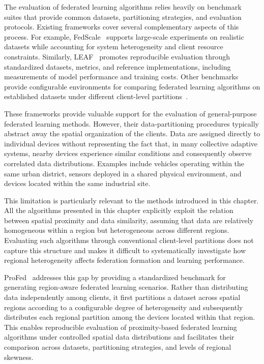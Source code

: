 The evaluation of federated learning algorithms relies heavily 
 on benchmark suites that provide common datasets, partitioning strategies, 
 and evaluation protocols.
%
Existing frameworks cover several complementary aspects of this process.
%
For example, 
 FedScale~\cite{DBLP:conf/icml/LaiDSLZMC22} supports large-scale experiments 
 on realistic datasets while accounting for system heterogeneity 
 and client resource constraints.
%
Similarly, 
 LEAF~\cite{DBLP:journals/corr/abs-1812-01097} 
  promotes reproducible evaluation through standardized datasets, metrics, 
  and reference implementations, including measurements of model performance and training costs.
%
Other benchmarks provide configurable environments for comparing federated learning algorithms 
 on established datasets under different client-level
 partitions~\cite{DBLP:journals/corr/abs-2007-13518,DBLP:journals/corr/abs-2007-14390}.

These frameworks provide valuable support for the evaluation 
 of general-purpose federated learning methods.
%
However, 
 their data-partitioning procedures typically abstract away 
 the spatial organization of the clients.
%
Data are assigned directly to individual devices without representing the fact that, 
 in many collective adaptive systems, nearby devices experience similar conditions 
 and consequently observe correlated data distributions.
%
Examples include vehicles operating within the same urban district, 
 sensors deployed in a shared physical environment, 
 and devices located within the same industrial site.

This limitation is particularly relevant to the methods introduced in this chapter.
%
All the algorithms presented in this chapter explicitly exploit 
 the relation between spatial proximity and data similarity, 
 assuming that data are relatively homogeneous within a region 
 but heterogeneous across different regions.
%
Evaluating such algorithms through conventional client-level partitions 
 does not capture this structure and makes it difficult to systematically investigate how
 regional heterogeneity affects federation formation and learning performance.

ProFed~\cite{DBLP:journals/jors/DominiIALV26} addresses this gap 
 by providing a standardized benchmark  for generating region-aware federated learning scenarios.
%
Rather than distributing data independently among clients, 
 it first partitions a dataset across spatial regions according to a configurable degree of heterogeneity
 and subsequently distributes each regional partition among the devices located within that region.
%
This enables reproducible evaluation of proximity-based federated learning algorithms 
 under controlled spatial data distributions and facilitates their
 comparison across datasets, partitioning strategies, and levels of regional skewness.

